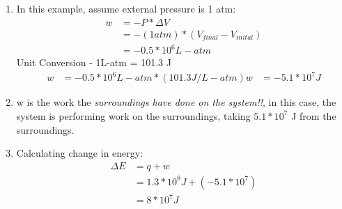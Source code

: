 \documentclass[../CHEM152Notes.tex]{subfiles}
\begin{document}
\begin{enumerate}
    \item In this example, assume external pressure is 1 atm:
        \begin{equation*}
            \begin{aligned}
                w &= -P * \Delta V \\
                  &= -(1atm)*(V_{final}-V_{inital}) \\
                  &= -0.5*10^6L-atm
            \end{aligned}
        \end{equation*}
        Unit Conversion - 1L-atm = 101.3 J
        \begin{equation*}
            \begin{aligned}
                w &= -0.5 * 10^6L-atm * (101.3 J/L-atm)
                w &= -5.1*10^7 J 
            \end{aligned}
        \end{equation*}
    \item w is the work the \emph{surroundings have done on the system!!}, in this case, the system is performing work on the surroundings, taking $5.1*10^7$ J from the surroundings.
    \item Calculating change in energy:
        \begin{equation*}
            \begin{aligned}
                \Delta E &= q + w \\
                    &= 1.3*10^8J + (-5.1*10^7) \\
                    &= 8*10^7J
            \end{aligned}
        \end{equation*}
\end{enumerate}
\end{document}
